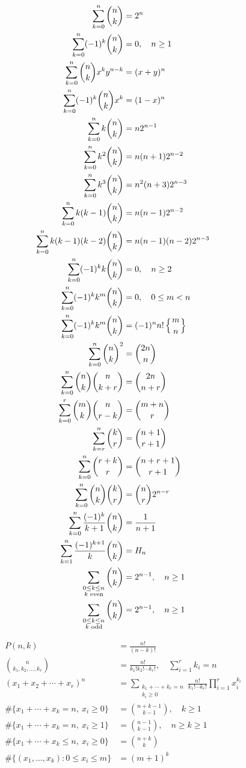 \begin{align*}
\sum_{k=0}^{n}\binom{n}{k} &= 2^n\\
\sum_{k=0}^{n}(-1)^k\binom{n}{k} &= 0,\quad n\ge1\\
\sum_{k=0}^{n}\binom{n}{k}x^ky^{n-k} &= (x+y)^n\\
\sum_{k=0}^{n}(-1)^k\binom{n}{k}x^k &= (1-x)^n\\
\sum_{k=0}^{n}k\binom{n}{k} &= n2^{n-1}\\
\sum_{k=0}^{n}k^2\binom{n}{k} &= n(n+1)2^{n-2}\\
\sum_{k=0}^{n}k^3\binom{n}{k} &= n^2(n+3)2^{n-3}\\
\sum_{k=0}^{n}k(k-1)\binom{n}{k}
&= n(n-1)2^{n-2}\\
\sum_{k=0}^{n}k(k-1)(k-2)\binom{n}{k}
&= n(n-1)(n-2)2^{n-3}\\
\sum_{k=0}^{n}(-1)^kk\binom{n}{k}
&= 0,\quad n\ge2\\
\sum_{k=0}^{n}(-1)^kk^m\binom{n}{k}
&= 0,\quad 0\le m<n\\
\sum_{k=0}^{n}(-1)^kk^m\binom{n}{k}
&= (-1)^nn!\left\{{m\atop n}\right\}\\
\sum_{k=0}^{n}\binom{n}{k}^2
&= \binom{2n}{n}\\
\sum_{k=0}^{n}\binom{n}{k}\binom{n}{k+r}
&= \binom{2n}{n+r}\\
\sum_{k=0}^{r}\binom{m}{k}\binom{n}{r-k}
&= \binom{m+n}{r}\\
\sum_{k=r}^{n}\binom{k}{r}
&= \binom{n+1}{r+1}\\
\sum_{k=0}^{n}\binom{r+k}{r}
&= \binom{n+r+1}{r+1}\\
\sum_{k=0}^{n}\binom{n}{k}\binom{k}{r}
&= \binom{n}{r}2^{n-r}\\
\sum_{k=0}^{n}\frac{(-1)^k}{k+1}\binom{n}{k}
&= \frac{1}{n+1}\\
\sum_{k=1}^{n}\frac{(-1)^{k+1}}{k}\binom{n}{k}
&= H_n\\
\sum_{\substack{0\le k\le n\\k\text{ even}}}\binom{n}{k}
&= 2^{n-1},\quad n\ge1\\
\sum_{\substack{0\le k\le n\\k\text{ odd}}}\binom{n}{k}
&= 2^{n-1},\quad n\ge1
\end{align*}

\begin{align*}
P(n,k) &= \frac{n!}{(n-k)!}\\
\binom{n}{k_1,k_2,\ldots,k_r}
&= \frac{n!}{k_1!k_2!\cdots k_r!},
\quad \sum_{i=1}^{r}k_i=n\\
(x_1+x_2+\cdots+x_r)^n
&= \sum_{\substack{k_1+\cdots+k_r=n\\k_i\ge0}}
\frac{n!}{k_1!\cdots k_r!}
\prod_{i=1}^{r}x_i^{k_i}\\
\#\{x_1+\cdots+x_k=n,\ x_i\ge0\}
&= \binom{n+k-1}{k-1},\quad k\ge1\\
\#\{x_1+\cdots+x_k=n,\ x_i\ge1\}
&= \binom{n-1}{k-1},\quad n\ge k\ge1\\
\#\{x_1+\cdots+x_k\le n,\ x_i\ge0\}
&= \binom{n+k}{k}\\
\#\{(x_1,\ldots,x_k):0\le x_i\le m\}
&= (m+1)^k
\end{align*}

